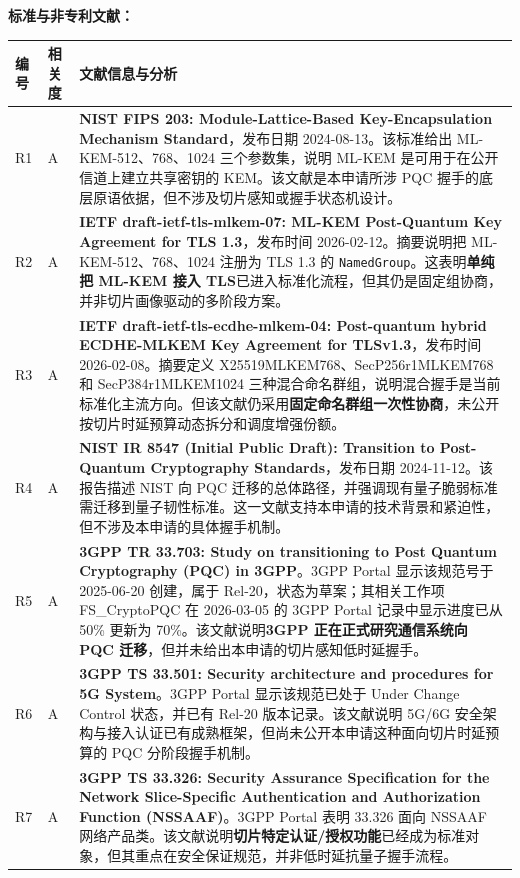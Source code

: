 \documentclass[12pt,a4paper]{article}
\begin{document}
\textbf{标准与非专利文献：}

\begingroup
{}
\small
\renewcommand{\arraystretch}{1.2}
\begin{longtable}{|p{1.2cm}|p{1.6cm}|p{11cm}|}
\hline
\textbf{编号} & \textbf{相关度} & \textbf{文献信息与分析} \\
\hline
R1 & A & \textbf{NIST FIPS 203: Module-Lattice-Based Key-Encapsulation Mechanism Standard}，发布日期 2024-08-13。该标准给出 ML-KEM-512、768、1024 三个参数集，说明 ML-KEM 是可用于在公开信道上建立共享密钥的 KEM。该文献是本申请所涉 PQC 握手的底层原语依据，但不涉及切片感知或握手状态机设计。 \\
\hline
R2 & A & \textbf{IETF draft-ietf-tls-mlkem-07: ML-KEM Post-Quantum Key Agreement for TLS 1.3}，发布时间 2026-02-12。摘要说明把 ML-KEM-512、768、1024 注册为 TLS 1.3 的 \texttt{NamedGroup}。这表明\textbf{单纯把 ML-KEM 接入 TLS}已进入标准化流程，但其仍是固定组协商，并非切片画像驱动的多阶段方案。 \\
\hline
R3 & A & \textbf{IETF draft-ietf-tls-ecdhe-mlkem-04: Post-quantum hybrid ECDHE-MLKEM Key Agreement for TLSv1.3}，发布时间 2026-02-08。摘要定义 X25519MLKEM768、SecP256r1MLKEM768 和 SecP384r1MLKEM1024 三种混合命名群组，说明混合握手是当前标准化主流方向。但该文献仍采用\textbf{固定命名群组一次性协商}，未公开按切片时延预算动态拆分和调度增强份额。 \\
\hline
R4 & A & \textbf{NIST IR 8547 (Initial Public Draft): Transition to Post-Quantum Cryptography Standards}，发布日期 2024-11-12。该报告描述 NIST 向 PQC 迁移的总体路径，并强调现有量子脆弱标准需迁移到量子韧性标准。这一文献支持本申请的技术背景和紧迫性，但不涉及本申请的具体握手机制。 \\
\hline
R5 & A & \textbf{3GPP TR 33.703: Study on transitioning to Post Quantum Cryptography (PQC) in 3GPP}。3GPP Portal 显示该规范号于 2025-06-20 创建，属于 Rel-20，状态为草案；其相关工作项 FS\_CryptoPQC 在 2026-03-05 的 3GPP Portal 记录中显示进度已从 50\% 更新为 70\%。该文献说明\textbf{3GPP 正在正式研究通信系统向 PQC 迁移}，但并未给出本申请的切片感知低时延握手。 \\
\hline
R6 & A & \textbf{3GPP TS 33.501: Security architecture and procedures for 5G System}。3GPP Portal 显示该规范已处于 Under Change Control 状态，并已有 Rel-20 版本记录。该文献说明 5G/6G 安全架构与接入认证已有成熟框架，但尚未公开本申请这种面向切片时延预算的 PQC 分阶段握手机制。 \\
\hline
R7 & A & \textbf{3GPP TS 33.326: Security Assurance Specification for the Network Slice-Specific Authentication and Authorization Function (NSSAAF)}。3GPP Portal 表明 33.326 面向 NSSAAF 网络产品类。该文献说明\textbf{切片特定认证/授权功能}已经成为标准对象，但其重点在安全保证规范，并非低时延抗量子握手流程。 \\

\end{longtable}
\end{document}
